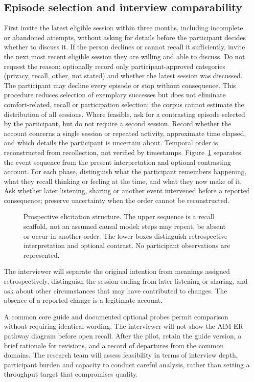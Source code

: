 \subsection{Episode selection and interview comparability}
First invite the latest eligible session within three months, including incomplete or abandoned attempts, without asking for details before the participant decides whether to discuss it. If the person declines or cannot recall it sufficiently, invite the next most recent eligible session they are willing and able to discuss. Do not request the reason; optionally record only participant-approved categories (privacy, recall, other, not stated) and whether the latest session was discussed. The participant may decline every episode or stop without consequence. This procedure reduces selection of exemplary successes but does not eliminate comfort-related, recall or participation selection; the corpus cannot estimate the distribution of all sessions. Where feasible, ask for a contrasting episode selected by the participant, but do not require a second session. Record whether the account concerns a single session or repeated activity, approximate time elapsed, and which details the participant is uncertain about. Temporal order is reconstructed from recollection, not verified by timestamps. Figure~\ref{fig:episode-elicitation} separates the event sequence from the present interpretation and optional contrasting account. For each phase, distinguish what the participant remembers happening, what they recall thinking or feeling at the time, and what they now make of it. Ask whether later listening, sharing or another event intervened before a reported consequence; preserve uncertainty when the order cannot be reconstructed.

\begin{figure}[htbp]
\centering

\caption{Prospective elicitation structure. The upper sequence is a recall scaffold, not an assumed causal model; steps may repeat, be absent or occur in another order. The lower boxes distinguish retrospective interpretation and optional contrast. No participant observations are represented.}
\label{fig:episode-elicitation}
\end{figure} The interviewer will separate the original intention from meanings assigned retrospectively, distinguish the session ending from later listening or sharing, and ask about other circumstances that may have contributed to changes. The absence of a reported change is a legitimate account.

A common core guide and documented optional probes permit comparison without requiring identical wording. The interviewer will not show the AIM-ER pathway diagram before open recall. After the pilot, retain the guide version, a brief rationale for revisions, and a record of departures from the common domains. The research team will assess feasibility in terms of interview depth, participant burden and capacity to conduct careful analysis, rather than setting a throughput target that compromises quality.

